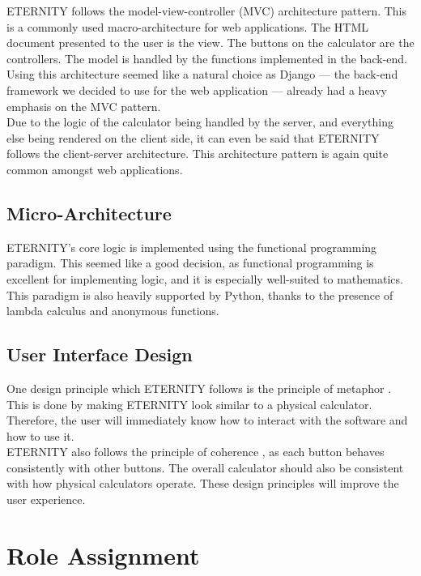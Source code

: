 \documentclass[11pt,onside]{report}
\begin{document}
ETERNITY follows the model-view-controller (MVC) architecture pattern. This is a commonly used macro-architecture for web applications. The HTML document presented to the user is the view. The buttons on the calculator are the controllers. The model is handled by the functions implemented in the back-end. Using this architecture seemed like a natural choice as Django — the back-end framework we decided to use for the web application — already had a heavy emphasis on the MVC pattern. \\

Due to the logic of the calculator being handled by the server, and everything else being rendered on the client side, it can even be said that ETERNITY follows the client-server architecture. This architecture pattern is again quite common amongst web applications.

\subsection{Micro-Architecture}

ETERNITY's core logic is implemented using the functional programming paradigm. This seemed like a good decision, as functional programming is excellent for implementing logic, and it is especially well-suited to mathematics. This paradigm is also heavily supported by Python, thanks to the presence of lambda calculus and anonymous functions.

\subsection{User Interface Design}

One design principle which ETERNITY follows is the principle of metaphor \cite{uid-principles}. This is done by making ETERNITY look similar to a physical calculator. Therefore, the user will immediately know how to interact with the software and how to use it. \\

ETERNITY also follows the principle of coherence \cite{uid-principles}, as each button behaves consistently with other buttons. The overall calculator should also be consistent with how physical calculators operate. These design principles will improve the user experience.

\section{Role Assignment}
\end{document}
